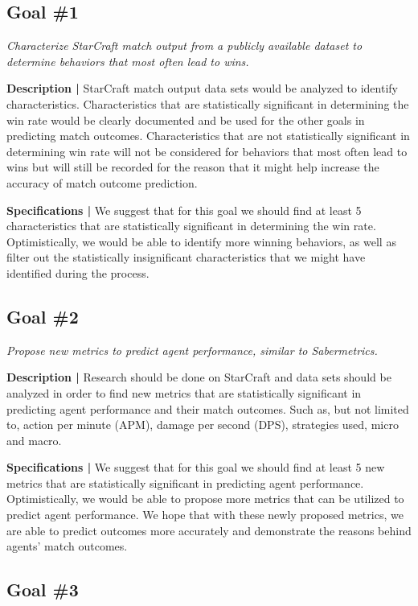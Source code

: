 \documentclass[a4paper,12pt]{report}
\begin{document}
\subsection{Goal \#1}

\textit{Characterize StarCraft match output from a publicly available dataset to determine behaviors that most often lead to wins.}

\textbf{Description |} StarCraft match output data sets would be analyzed to identify characteristics. Characteristics that are statistically significant in determining the win rate would be clearly documented and be used for the other goals in predicting match outcomes. Characteristics that are not statistically significant in determining win rate will not be considered for behaviors that most often lead to wins but will still be recorded for the reason that it might help increase the accuracy of match outcome prediction.

\textbf{Specifications |} We suggest that for this goal we should find at least 5 characteristics that are statistically significant in determining the win rate. Optimistically, we would be able to identify more winning behaviors, as well as filter out the statistically insignificant characteristics that we might have identified during the process. 

\subsection{Goal \#2}

\textit{Propose new metrics to predict agent performance, similar to Sabermetrics.}

\textbf{Description |} Research should be done on StarCraft and data sets should be analyzed in order to find new metrics that are statistically significant in predicting agent performance and their match outcomes. Such as, but not limited to, action per minute (APM), damage per second (DPS), strategies used, micro and macro.

\textbf{Specifications |} We suggest that for this goal we should find at least 5 new metrics that are statistically significant in predicting agent performance. Optimistically, we would be able to propose more metrics that can be utilized to predict agent performance. We hope that with these newly proposed metrics, we are able to predict outcomes more accurately and demonstrate the reasons behind agents’ match outcomes. 

\subsection{Goal \#3}
\end{document}

